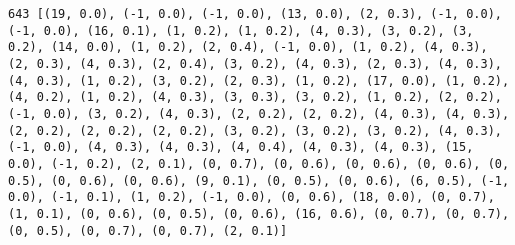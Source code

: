 \documentclass[11pt]{article}
\begin{document}
\begin{Verbatim}[commandchars=\\\{\}]
643 [(19, 0.0), (-1, 0.0), (-1, 0.0), (13, 0.0), (2, 0.3), (-1, 0.0), (-1, 0.0), (16, 0.1), (1, 0.2), (1, 0.2), (4, 0.3), (3, 0.2), (3, 0.2), (14, 0.0), (1, 0.2), (2, 0.4), (-1, 0.0), (1, 0.2), (4, 0.3), (2, 0.3), (4, 0.3), (2, 0.4), (3, 0.2), (4, 0.3), (2, 0.3), (4, 0.3), (4, 0.3), (1, 0.2), (3, 0.2), (2, 0.3), (1, 0.2), (17, 0.0), (1, 0.2), (4, 0.2), (1, 0.2), (4, 0.3), (3, 0.3), (3, 0.2), (1, 0.2), (2, 0.2), (-1, 0.0), (3, 0.2), (4, 0.3), (2, 0.2), (2, 0.2), (4, 0.3), (4, 0.3), (2, 0.2), (2, 0.2), (2, 0.2), (3, 0.2), (3, 0.2), (3, 0.2), (4, 0.3), (-1, 0.0), (4, 0.3), (4, 0.3), (4, 0.4), (4, 0.3), (4, 0.3), (15, 0.0), (-1, 0.2), (2, 0.1), (0, 0.7), (0, 0.6), (0, 0.6), (0, 0.6), (0, 0.5), (0, 0.6), (0, 0.6), (9, 0.1), (0, 0.5), (0, 0.6), (6, 0.5), (-1, 0.0), (-1, 0.1), (1, 0.2), (-1, 0.0), (0, 0.6), (18, 0.0), (0, 0.7), (1, 0.1), (0, 0.6), (0, 0.5), (0, 0.6), (16, 0.6), (0, 0.7), (0, 0.7), (0, 0.5), (0, 0.7), (0, 0.7), (2, 0.1)]

\end{Verbatim}
\end{document}

